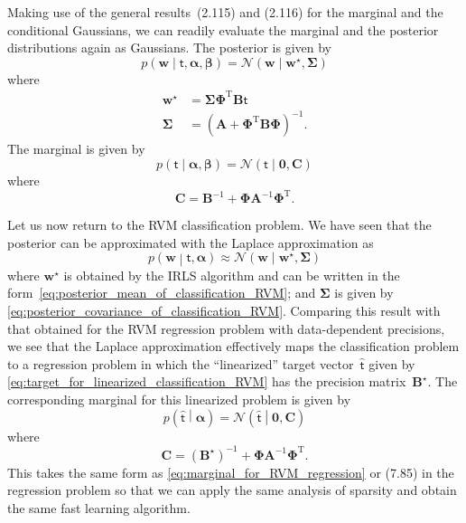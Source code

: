 \documentclass[12pt,a4paper]{article}
\begin{document}
Making use of the general results~(2.115) and (2.116) for
the marginal and the conditional Gaussians,
we can readily evaluate the marginal and the posterior distributions again as Gaussians.
The posterior is given by
\begin{equation}
p \left( \mathbf{w} \middle| \bm{\mathsf{t}}, \bm{\alpha}, \bm{\beta} \right)
= \mathcal{N} \left( \mathbf{w} \middle| \mathbf{w}^{\star}, \bm{\Sigma} \right)
\end{equation}
where
\begin{align}
\mathbf{w}^{\star} &= \bm{\Sigma} \bm{\Phi}^{\operatorname{T}} \mathbf{B} \bm{\mathsf{t}} \\
\bm{\Sigma} &= \left(
\mathbf{A} + \bm{\Phi}^{\operatorname{T}} \mathbf{B} \bm{\Phi}
\right)^{-1} .
\end{align}
The marginal is given by
\begin{equation}
p \left( \bm{\mathsf{t}} \middle| \bm{\alpha}, \bm{\beta} \right)
= \mathcal{N} \left( \bm{\mathsf{t}} \middle| \mathbf{0}, \mathbf{C} \right)
\label{eq:marginal_for_RVM_regression}
\end{equation}
where
\begin{equation}
\mathbf{C} = \mathbf{B}^{-1} + \bm{\Phi} \mathbf{A}^{-1} \bm{\Phi}^{\operatorname{T}} .
\end{equation}

Let us now return to the RVM classification problem.
We have seen that the posterior can be approximated with the Laplace approximation as
\begin{equation}
p \left( \mathbf{w} \middle| \bm{\mathsf{t}}, \bm{\alpha} \right)
\approx
\mathcal{N}\left( \mathbf{w} \middle| \mathbf{w}^{\star}, \bm{\Sigma} \right)
\end{equation}
where $\mathbf{w}^{\star}$ is obtained by the IRLS algorithm and
can be written in the form~\eqref{eq:posterior_mean_of_classification_RVM};
and $\bm{\Sigma}$ is given by \eqref{eq:posterior_covariance_of_classification_RVM}.
Comparing this result with that obtained for
the RVM regression problem with data-dependent precisions,
we see that the Laplace approximation effectively maps the classification problem to
a regression problem in which the ``linearized'' target vector~$\widehat{\bm{\mathsf{t}}}$
given by \eqref{eq:target_for_linearized_classification_RVM}
has the precision matrix~$\mathbf{B}^{\star}$.
The corresponding marginal for this linearized problem is given by
\begin{equation}
p \left( \widehat{\bm{\mathsf{t}}} \middle| \bm{\alpha} \right)
= \mathcal{N}\left( \widehat{\bm{\mathsf{t}}} \middle| \mathbf{0}, \mathbf{C} \right)
\end{equation}
where
\begin{equation}
\mathbf{C}
= \left( \mathbf{B}^{\star} \right)^{-1}
+ \bm{\Phi} \mathbf{A}^{-1} \bm{\Phi}^{\operatorname{T}} .
\label{eq:marginal_covariance_of_linearized_classification_RVM}
\end{equation}
This takes the same form as \eqref{eq:marginal_for_RVM_regression} or (7.85)
in the regression problem
so that we can apply the same analysis of sparsity and obtain the same fast learning algorithm.
\end{document}
